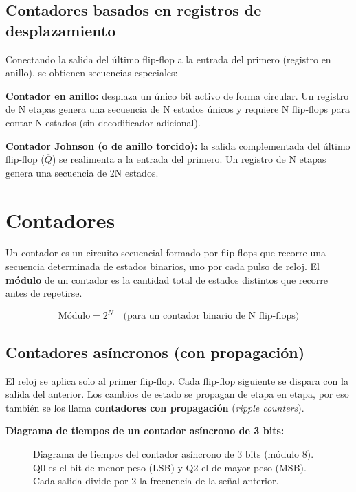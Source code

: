 \subsection{Contadores basados en registros de desplazamiento}

Conectando la salida del último flip-flop a la entrada del primero (registro en anillo), se obtienen secuencias especiales:

\textbf{Contador en anillo:} desplaza un único bit activo de forma circular. Un registro de N etapas genera una secuencia de N estados únicos y requiere N flip-flops para contar N estados (sin decodificador adicional).

\textbf{Contador Johnson (o de anillo torcido):} la salida complementada del último flip-flop ($\overline{Q}$) se realimenta a la entrada del primero. Un registro de N etapas genera una secuencia de 2N estados.

\section{Contadores}

Un contador es un circuito secuencial formado por flip-flops que recorre una secuencia determinada de estados binarios, uno por cada pulso de reloj. El \textbf{módulo} de un contador es la cantidad total de estados distintos que recorre antes de repetirse.

$$\text{Módulo} = 2^N \quad \text{(para un contador binario de N flip-flops)}$$

\subsection{Contadores asíncronos (con propagación)}

El reloj se aplica solo al primer flip-flop. Cada flip-flop siguiente se dispara con la salida del anterior. Los cambios de estado se propagan de etapa en etapa, por eso también se los llama \textbf{contadores con propagación} (\textit{ripple counters}).


\textbf{Diagrama de tiempos de un contador asíncrono de 3 bits:}

\begin{figure}[H]
\centering

\caption{Diagrama de tiempos del contador asíncrono de 3 bits (módulo 8).
  Q0 es el bit de menor peso (LSB) y Q2 el de mayor peso (MSB).
  Cada salida divide por 2 la frecuencia de la señal anterior.}
\end{figure}

